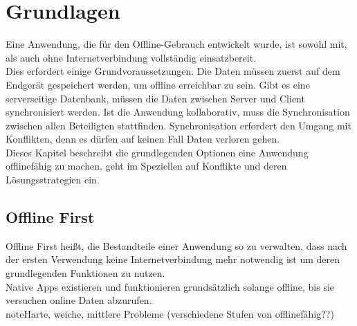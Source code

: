 \chapter{\label{chap:grundlagen}Grundlagen}
Eine Anwendung, die für den Offline-Gebrauch entwickelt wurde, ist sowohl mit, als auch ohne Internetverbindung vollständig einsatzbereit.\\
Dies erfordert einige Grundvoraussetzungen. Die Daten müssen zuerst auf dem Endgerät gespeichert werden, um offline erreichbar zu sein.
Gibt es eine serverseitige Datenbank, müssen die Daten zwischen Server und Client synchronisiert werden. Ist die Anwendung kollaborativ, muss die Synchronisation zwischen allen Beteiligten stattfinden. Synchronisation erfordert den Umgang mit Konflikten, denn es dürfen auf keinen Fall Daten verloren gehen.\\
Dieses Kapitel beschreibt die grundlegenden Optionen eine Anwendung offlinefähig zu machen, geht im Speziellen auf Konflikte und deren Lösungsstrategien ein. 
%
%
\section{\label{chap:offlinefirst}Offline First}
Offline First heißt, die Bestandteile einer Anwendung so zu verwalten, dass nach der ersten Verwendung keine Internetverbindung mehr notwendig ist um deren grundlegenden Funktionen zu nutzen.\\
Native \Glspl{App} existieren und funktionieren grundsätzlich solange offline, bis sie versuchen online Daten abzurufen.\\
note{Harte, weiche, mittlere Probleme (verschiedene Stufen von offlinefähig??)}\\

